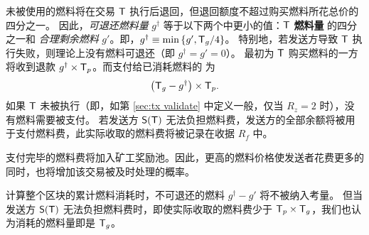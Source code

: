 未被使用的燃料将在交易 $\textsf{T}$ 执行后退回，但退回额度不超过购买燃料所花总价的四分之一。
因此，\emph{可退还燃料量} $g^{\dagger}$ 等于以下两个中更小的值：$\textsf{T}$ \textbf{燃料量} 的四分之一和 \emph{合理剩余燃料} $g'$。即，$g^{\dagger}\equiv \min{\left \{{g', \textsf{T}_g/4} \right \}}$。
特别地，若发送方导致 $\textsf{T}$ 执行失败，则理论上没有燃料可退还（即 $g^{\dagger} = g' = 0$）。
最初为 $\textsf{T}$ 购买燃料的一方将收到退款 $g^{\dagger}\times\textsf{T}_p$。而支付给已消耗燃料的 \coinsign 为
	\begin{align}
		\left(\textsf{T}_g-g^{\dagger}\right)\times \textsf{T}_p.
	\end{align}
如果 $\textsf{T}$ 未被执行（即，如第 \ref{sec:tx validate} 中定义一般，仅当 $R_z=2$ 时），没有燃料需要被支付。
若发送方 $\mathsf{S}{\left({\textsf{T}} \right)}$ 无法负担燃料费，发送方的全部余额将被用于支付燃料费，此实际收取的燃料费将被记录在收据 $R_f$ 中。


支付完毕的燃料费将加入矿工奖励池。因此，更高的燃料价格使发送者花费更多的同时，也将增加该交易被及时处理的概率。


计算整个区块的累计燃料消耗时，不可退还的燃料 $g^{\dagger} - g'$ 将不被纳入考量。
但当发送方 $\mathsf{S}{\left({\textsf{T}} \right)}$ 无法负担燃料费时，即使实际收取的燃料费少于 $\textsf{T}_p\times\textsf{T}_g$，我们也认为消耗的燃料量即是 $\textsf{T}_g$。


